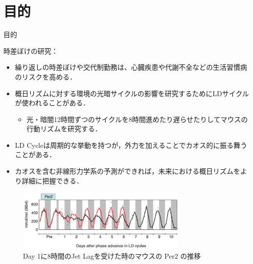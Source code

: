 \section{目的}
\begin{frame}{目的}
    \begin{minipage}{0.49\linewidth}
        時差ぼけの研究：
        \begin{itemize}
            \item 繰り返しの時差ぼけや交代制勤務は、心臓疾患や代謝不全などの生活習慣病のリスクを高める．
            \item 概日リズムに対する環境の光暗サイクルの影響を研究するためにLDサイクルが使われることがある．\begin{itemize}
                \item 光・暗闇12時間ずつのサイクルを8時間進めたり遅らせたりしてマウスの行動リズムを研究する．
            \end{itemize}
        \end{itemize}
    \end{minipage}
    \begin{minipage}{0.5\linewidth}
        \begin{itemize}
            \item LD Cycleは周期的な挙動を持つが，外力を加えることでカオス的に振る舞うことがある．
            \item カオスを含む非線形力学系の予測ができれば，未来における概日リズムをより詳細に把握できる．
        \end{itemize}
        \begin{figure}
            \includegraphics[width=0.75\textwidth]{Fig/Jetlag.png}
            \caption{Day 1に8時間のJet Lagを受けた時のマウスの Per2 の推移}
            \label{jetlag} 
        \end{figure}    
    \end{minipage}
\end{frame}


